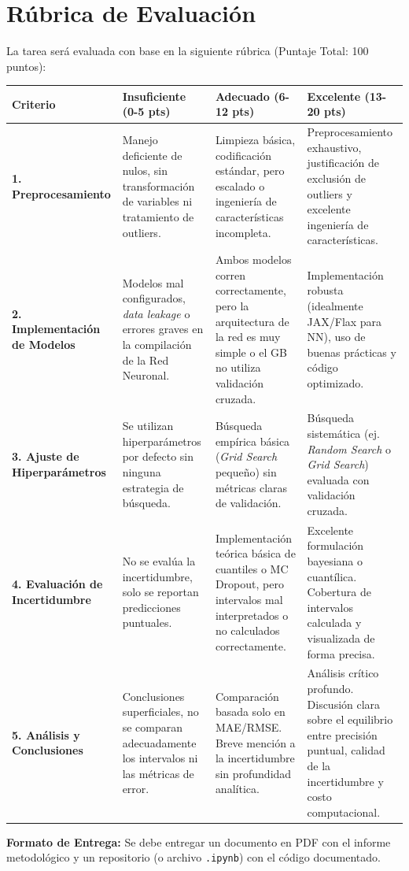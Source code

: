 \documentclass[11pt,a4paper]{article}
\begin{document}
\newpage
\section{Rúbrica de Evaluación}

La tarea será evaluada con base en la siguiente rúbrica (Puntaje Total: 100 puntos):

\vspace{0.5cm}
\noindent
\begin{tabularx}{\textwidth}{>{\hsize=0.2\hsize}X >{\hsize=0.25\hsize}X >{\hsize=0.25\hsize}X >{\hsize=0.3\hsize}X}
\toprule
\textbf{Criterio} & \textbf{Insuficiente (0-5 pts)} & \textbf{Adecuado (6-12 pts)} & \textbf{Excelente (13-20 pts)} \\
\midrule
\textbf{1. Preprocesamiento} & 
Manejo deficiente de nulos, sin transformación de variables ni tratamiento de outliers. & 
Limpieza básica, codificación estándar, pero escalado o ingeniería de características incompleta. & 
Preprocesamiento exhaustivo, justificación de exclusión de outliers y excelente ingeniería de características. \\
\addlinespace
\textbf{2. Implementación de Modelos} & 
Modelos mal configurados, \textit{data leakage} o errores graves en la compilación de la Red Neuronal. & 
Ambos modelos corren correctamente, pero la arquitectura de la red es muy simple o el GB no utiliza validación cruzada. & 
Implementación robusta (idealmente JAX/Flax para NN), uso de buenas prácticas y código optimizado. \\
\addlinespace
\textbf{3. Ajuste de Hiperparámetros} & 
Se utilizan hiperparámetros por defecto sin ninguna estrategia de búsqueda. & 
Búsqueda empírica básica (\textit{Grid Search} pequeño) sin métricas claras de validación. & 
Búsqueda sistemática (ej. \textit{Random Search} o \textit{Grid Search}) evaluada con validación cruzada. \\
\addlinespace
\textbf{4. Evaluación de Incertidumbre} & 
No se evalúa la incertidumbre, solo se reportan predicciones puntuales. & 
Implementación teórica básica de cuantiles o MC Dropout, pero intervalos mal interpretados o no calculados correctamente. & 
Excelente formulación bayesiana o cuantílica. Cobertura de intervalos calculada y visualizada de forma precisa. \\
\addlinespace
\textbf{5. Análisis y Conclusiones} & 
Conclusiones superficiales, no se comparan adecuadamente los intervalos ni las métricas de error. & 
Comparación basada solo en MAE/RMSE. Breve mención a la incertidumbre sin profundidad analítica. & 
Análisis crítico profundo. Discusión clara sobre el equilibrio entre precisión puntual, calidad de la incertidumbre y costo computacional. \\
\bottomrule
\end{tabularx}

\vspace{1cm}
\noindent \textbf{Formato de Entrega:} Se debe entregar un documento en PDF con el informe metodológico y un repositorio (o archivo \texttt{.ipynb}) con el código documentado.
\end{document}
